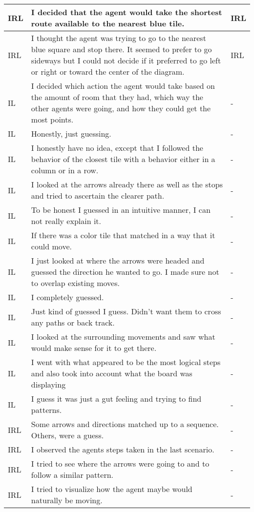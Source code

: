 \documentclass{article}
\begin{document}
\begin{longtable}{ | m{0.6in} | m{5in}| m{0.6in} | }
IRL & I decided that the agent would take the shortest route available to the nearest blue tile.  & IRL \\ \hline
IRL & I thought the agent was trying to go to the nearest blue square and stop there. It seemed to prefer to go sideways but I could not decide if it preferred to go left or right or toward the center of the diagram. & IRL \\ \hline
IL & I decided which action the agent would take based on the amount of room that they had, which way the other agents were going, and how they could get the most points. & - \\ \hline
IL & Honestly, just guessing. & - \\ \hline
IL & I honestly have no idea, except that I followed the behavior of the closest tile with a behavior either in a column or in a row. & - \\ \hline
IL & I looked at the arrows already there as well as the stops and tried to ascertain the clearer path. & - \\ \hline
IL & To be honest I guessed in an intuitive manner, I can not really explain it. & - \\ \hline
IL & If there was a color tile that matched in a way that it could move. & - \\ \hline
IL & I just looked at where the arrows were headed and guessed the direction he wanted to go. I made sure not to overlap existing moves. & - \\ \hline
IL & I completely guessed. & - \\ \hline
IL & Just kind of guessed I guess. Didn't want them to cross any paths or back track. & - \\ \hline
IL & I looked at the surrounding movements and saw what would make sense for it to get there. & - \\ \hline
IL & I went with what appeared to be the most logical steps and also took into account what the board was displaying & - \\ \hline
IL & I guess it was just a gut feeling and trying to find patterns. & - \\ \hline
IRL & Some arrows and directions matched up to a sequence. Others, were a guess. & - \\ \hline
IRL & I observed the agents steps taken in the last scenario. & - \\ \hline
IRL & I tried to see where the arrows were going to and to follow a similar pattern. & - \\ \hline
IRL & I tried to visualize how the agent maybe would naturally be moving. & - \\ \hline

\end{longtable}
\end{document}
